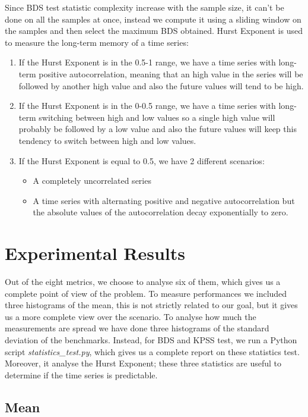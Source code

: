 Since BDS test statistic complexity increase with the sample size, it can't be done on all the samples at once, instead we compute it using a sliding window on the samples and then select the maximum BDS obtained.\newline
Hurst Exponent is used to measure the long-term memory of a time series:
\begin{enumerate}
	\item If the Hurst Exponent is in the 0.5-1 range, we have a time series with long-term positive autocorrelation, meaning that an high value in the series will be followed by another high value and also the future values will tend to be high.
	\item If the Hurst Exponent is in the 0-0.5 range, we have a time series with long-term switching between high and low values so a single high value will probably be followed by a low value and also the future values will keep this tendency to switch between high and low values.
	\item If the Hurst Exponent is equal to 0.5, we have 2 different scenarios:
	\begin{itemize}
		\item A completely uncorrelated series
		\item A time series with alternating positive and negative autocorrelation but the absolute values of the autocorrelation decay exponentially to zero.
	\end{itemize}
\end{enumerate}



\section{Experimental Results}

Out of the eight metrics, we choose to analyse six of them, which gives us a complete point of view of the problem.
To measure performances we included three histograms of the mean, this is not strictly related to our goal, but it gives us a more complete view over the scenario.
To analyse how much the measurements are spread we have done three histograms of the standard deviation of the benchmarks.
Instead, for BDS and KPSS test, we run a Python script \textit{statistics\_test.py}, which gives us a complete report on these statistics test. Moreover, it analyse the Hurst Exponent; these three statistics are useful to determine if the time series is predictable.
\subsection{Mean}

